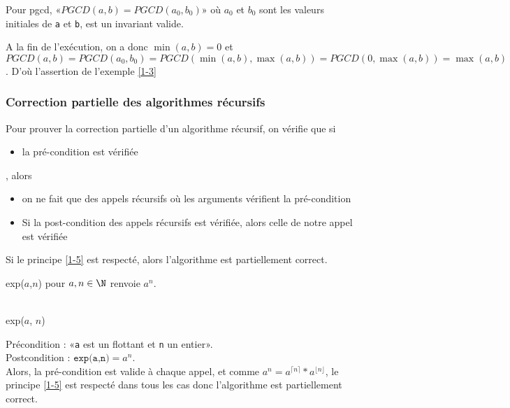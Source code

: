 \begin{example}
	Pour pgcd, «$PGCD(a,b) = PGCD(a_0, b_0)$» où $a_0$ et $b_0$ sont les valeurs initiales de \texttt{a} et \texttt{b}, est un invariant valide.
	
	A la fin de l'exécution, on a donc $\min(a,b) = 0$ et $PGCD(a,b) = PGCD(a_0, b_0) = PGCD(\min(a,b), \max(a,b)) = PGCD(0, \max(a,b)) = \max(a,b)$. D'où l'assertion de l'exemple \ref{1-3}
\end{example}

\subsubsection{Correction partielle des algorithmes récursifs}


\begin{principe}
	Pour prouver la correction partielle d'un algorithme récursif, on vérifie que si \begin{itemize}[label=$\bullet$]
		\item la pré-condition est vérifiée
	\end{itemize}, alors
	\begin{itemize}[label=$\bullet$] 
		\item on ne fait que des appels récursifs où les arguments vérifient la pré-condition
		\item Si la post-condition des appels récursifs est vérifiée, alors celle de notre appel est vérifiée
	\end{itemize}
	\label{1-5}
\end{principe}

\begin{theorem}
	Si le principe \ref{1-5} est respecté, alors l'algorithme est partiellement correct.
\end{theorem}

\begin{example}
	\label{1-7}
	exp($a$,$n$) pour $a,n\in \N$ renvoie $a^n$.\\\\
	\begin{minipage}{0.5\linewidth}
		\begin{algorithm}[H]
			\caption{exp($a$, $n$)}
			\end{algorithm}
	\end{minipage} \quad \begin{minipage}{0.4\linewidth}
		Précondition : «\texttt a est un flottant et \texttt n un entier».\\
		Postcondition : $\texttt{exp(a,n)} = a^n$.\\
		Alors, la pré-condition est valide à chaque appel, et comme $a^n = a^{\lceil n \rceil} * a^{\lfloor n \rfloor}$, le principe \ref{1-5} est respecté dans tous les cas donc l'algorithme est partiellement correct.
	\end{minipage}
\end{example}

